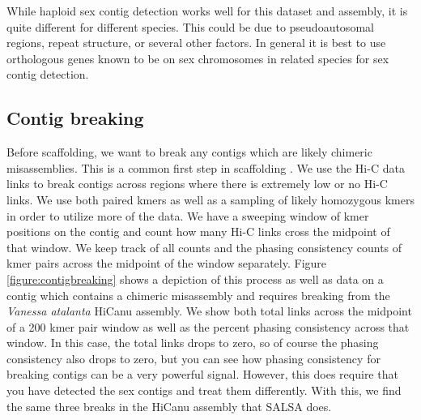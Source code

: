 {\par{
While haploid sex contig detection works well for this dataset and assembly, it is quite different for different species. This could be due to pseudoautosomal regions, repeat structure, or several other factors. In general it is best to use orthologous genes known to be on sex chromosomes in related species for sex contig detection.
}

\subsection{Contig breaking}

\par{
Before scaffolding, we want to break any contigs which are likely chimeric misassemblies. This is a common first step in scaffolding \cite{SALSA}\cite{scaffoldingreview}. We use the Hi-C data links to break contigs across regions where there is extremely low or no Hi-C links. We use both paired kmers as well as a sampling of likely homozygous kmers in order to utilize more of the data. We have a sweeping window of kmer positions on the contig and count how many Hi-C links cross the midpoint of that window. We keep track of all counts and the phasing consistency counts of kmer pairs across the midpoint of the window separately. Figure \ref{figure:contigbreaking} shows a depiction of this process as well as data on a contig which contains a chimeric misassembly and requires breaking from the \textit{Vanessa atalanta} HiCanu assembly. We show both total links across the midpoint of a 200 kmer pair window as well as the percent phasing consistency across that window. In this case, the total links drops to zero, so of course the phasing consistency also drops to zero, but you can see how phasing consistency for breaking contigs can be a very powerful signal. However, this does require that you have detected the sex contigs and treat them differently. With this, we find the same three breaks in the HiCanu assembly that SALSA does.
}

}
